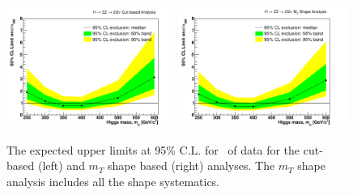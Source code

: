 \begin{figure}[!htbp]
\begin{center}
   \includegraphics[width=0.49\textwidth]{figures/limits_cut_4fb.pdf}
   \includegraphics[width=0.49\textwidth]{figures/limits_mtshape_4fb.pdf}
   \caption{ The expected upper limits at 95\% C.L. for \intlumi\ of data for the cut-based (left) and $m_T$ shape based (right) analyses. The $m_T$ shape analysis includes all the shape systematics. }
   \label{fig:limits_4fb}
\end{center}
\end{figure}
